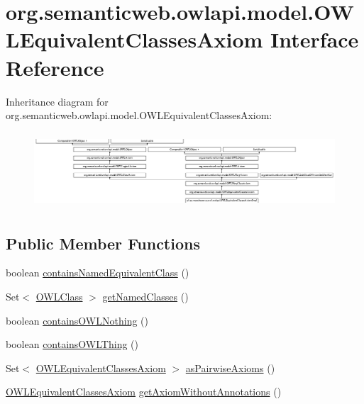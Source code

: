 \hypertarget{interfaceorg_1_1semanticweb_1_1owlapi_1_1model_1_1_o_w_l_equivalent_classes_axiom}{\section{org.\-semanticweb.\-owlapi.\-model.\-O\-W\-L\-Equivalent\-Classes\-Axiom Interface Reference}
\label{interfaceorg_1_1semanticweb_1_1owlapi_1_1model_1_1_o_w_l_equivalent_classes_axiom}
}
Inheritance diagram for org.\-semanticweb.\-owlapi.\-model.\-O\-W\-L\-Equivalent\-Classes\-Axiom\-:\begin{figure}[H]
\begin{center}
\leavevmode
\includegraphics[height=2.857143cm]{interfaceorg_1_1semanticweb_1_1owlapi_1_1model_1_1_o_w_l_equivalent_classes_axiom}
\end{center}
\end{figure}
\subsection*{Public Member Functions}
\begin{DoxyCompactItemize}
\item 
boolean \hyperlink{interfaceorg_1_1semanticweb_1_1owlapi_1_1model_1_1_o_w_l_equivalent_classes_axiom_ad8ed262abc144c481aabd875d27b81cf}{contains\-Named\-Equivalent\-Class} ()
\item 
Set$<$ \hyperlink{interfaceorg_1_1semanticweb_1_1owlapi_1_1model_1_1_o_w_l_class}{O\-W\-L\-Class} $>$ \hyperlink{interfaceorg_1_1semanticweb_1_1owlapi_1_1model_1_1_o_w_l_equivalent_classes_axiom_a84edd9e7a5f363c3371a920e72d11439}{get\-Named\-Classes} ()
\item 
boolean \hyperlink{interfaceorg_1_1semanticweb_1_1owlapi_1_1model_1_1_o_w_l_equivalent_classes_axiom_a6cc9969c7df6fbbc9a9e01ab361c3136}{contains\-O\-W\-L\-Nothing} ()
\item 
boolean \hyperlink{interfaceorg_1_1semanticweb_1_1owlapi_1_1model_1_1_o_w_l_equivalent_classes_axiom_a9282a663b58dd4f1c6300342a5a21238}{contains\-O\-W\-L\-Thing} ()
\item 
Set$<$ \hyperlink{interfaceorg_1_1semanticweb_1_1owlapi_1_1model_1_1_o_w_l_equivalent_classes_axiom}{O\-W\-L\-Equivalent\-Classes\-Axiom} $>$ \hyperlink{interfaceorg_1_1semanticweb_1_1owlapi_1_1model_1_1_o_w_l_equivalent_classes_axiom_aeecc3f5b3c8bcd0dd2a2244e008fdc83}{as\-Pairwise\-Axioms} ()
\item 
\hyperlink{interfaceorg_1_1semanticweb_1_1owlapi_1_1model_1_1_o_w_l_equivalent_classes_axiom}{O\-W\-L\-Equivalent\-Classes\-Axiom} \hyperlink{interfaceorg_1_1semanticweb_1_1owlapi_1_1model_1_1_o_w_l_equivalent_classes_axiom_a27bcf4fc266c2c35890e5e15151df7bd}{get\-Axiom\-Without\-Annotations} ()
\end{DoxyCompactItemize}


